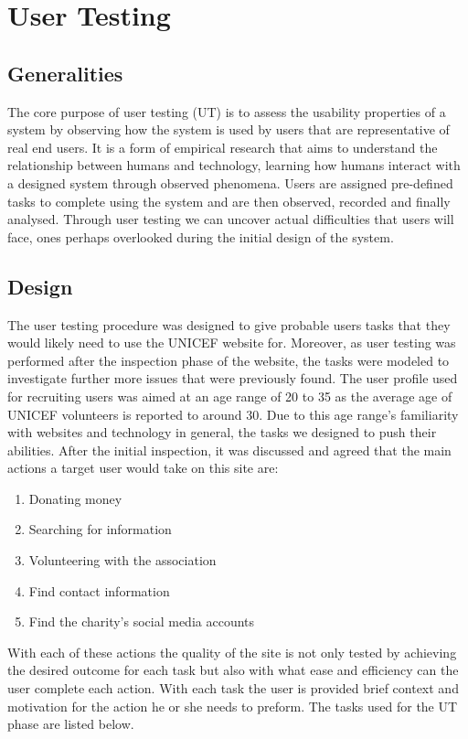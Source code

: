 \section{User Testing}

\subsection{Generalities}
The core purpose of user testing (UT) is to assess the usability properties of a system by observing how the system is used by users that are representative of real end users. 
It is a form of empirical research that aims to understand the relationship between humans and technology, learning how humans interact with a designed system through observed phenomena. 
Users are assigned pre-defined tasks to complete using the system and are then observed, recorded and finally analysed. 
Through user testing we can uncover actual difficulties that users will face, ones perhaps overlooked during the initial design of the system.

\subsection{Design}
The user testing procedure was designed to give probable users tasks that they would likely need to use the UNICEF website for. 
Moreover, as user testing was performed after the inspection phase of the website, the tasks were modeled to investigate further more issues that were previously found. 
The user profile used for recruiting users was aimed at an age range of 20 to 35 as the average age of UNICEF volunteers is reported to around 30. 
Due to this age range’s familiarity with websites and technology in general, the tasks we designed to push their abilities.
After the initial inspection, it was discussed and agreed that the main actions a target user would take on this site are: 

\begin{enumerate}
    \item Donating money
    \item Searching for information
    \item Volunteering with the association
    \item Find contact information
    \item Find the charity’s social media accounts
\end{enumerate}

With each of these actions the quality of the site is not only tested by achieving the desired outcome for each task but also with what ease and efficiency can the user complete each action. 
With each task the user is provided brief context and motivation for the action he or she needs to preform. 
The tasks used for the UT phase are listed below.

